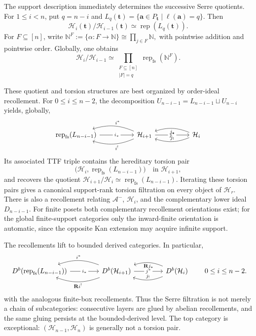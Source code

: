 \documentclass[12pt,reqno]{amsart}
\theoremstyle{definition}
\theoremstyle{remark}
\newcommand{\Rep}{\operatorname{rep}}
\begin{document}
The support description immediately determines the successive Serre
quotients.  For $1\le i<n$, put $q=n-i$ and $
L_q(\mathbf t)=\{\mathbf a\in P_{\mathbf t}\mid\ell(\mathbf a)=q\}.$
Then
\begin{equation}\label{eq:intro-quotient}
\mathcal H_i(\mathbf t)/\mathcal H_{i-1}(\mathbf t)
\simeq\Rep(L_q(\mathbf t)).
\end{equation}
For $F\subseteq[n]$, write $
\mathbb N^F:=\{\alpha:F\longrightarrow\mathbb N\}
\cong\prod_{j\in F}\mathbb N,$
with pointwise addition and pointwise order.  Globally, one obtains
\[
\mathcal H_i/\mathcal H_{i-1}
\simeq
\prod_{\substack{F\subseteq[n]\\|F|=q}}
\Rep_{\mathrm{fs}}(\mathbb N^F).
\]

These quotient and torsion structures are best organized by order-ideal
recollement.  For $0\le i\le n-2$, the decomposition
$U_{n-i-1}=L_{n-i-1}\sqcup U_{n-i}$ yields, globally,
\begin{equation}\label{eq:intro-global-recollement}
\begin{tikzcd}[column sep=5.0em]
\Rep_{\mathrm{fs}}(L_{n-i-1})
  \arrow[r, "i_*" description]
& \mathcal H_{i+1}
  \arrow[l, bend right=20, "i^*"']
  \arrow[l, bend left=20, "i^!"]
  \arrow[r, "j^*" description]
& \mathcal H_i
  \arrow[l, bend left=20, "j_!"']
  \arrow[l, bend right=20, "j_*"]
\end{tikzcd}
\end{equation}
Its associated TTF triple contains the hereditary torsion pair
\[
\bigl(\mathcal H_i,\Rep_{\mathrm{fs}}(L_{n-i-1})\bigr)
\quad\text{in }\mathcal H_{i+1},
\]
and recovers the quotient
$\mathcal H_{i+1}/\mathcal H_i\simeq
\Rep_{\mathrm{fs}}(L_{n-i-1})$.  Iterating these torsion pairs gives a
canonical support-rank torsion filtration on every object of
$\mathcal H_r$.  There is also a recollement relating $\mathcal A^-$,
$\mathcal H_i$, and the complementary lower ideal $D_{n-i-1}$.
For finite posets both complementary recollement orientations exist; for the
global finite-support categories only the inward-finite orientation is
automatic, since the opposite Kan extension may acquire infinite support.

The recollements lift to bounded derived categories.  In particular,
\begin{equation}\label{eq:intro-derived-recollement}
\begin{tikzcd}[column sep=4.2em]
D^b\!\left(\Rep_{\mathrm{fs}}(L_{n-i-1})\right)
  \arrow[r, "i_*" description]
& D^b(\mathcal H_{i+1})
  \arrow[l, bend right=20, "i^*"']
  \arrow[l, bend left=20, "\mathbf R i^!"]
  \arrow[r, "j^*" description]
& D^b(\mathcal H_i)
  \arrow[l, bend left=20, "j_!"']
  \arrow[l, bend right=20, "\mathbf R j_*"]
\end{tikzcd}
\qquad 0\le i\le n-2.
\end{equation}
with the analogous finite-box recollements.  Thus the Serre filtration is not
merely a chain of subcategories: consecutive layers are glued by abelian
recollements, and the same gluing persists at the bounded-derived level.  The
top category is exceptional: $(\mathcal H_{n-1},\mathcal H_n)$ is generally
not a torsion pair.
\end{document}
